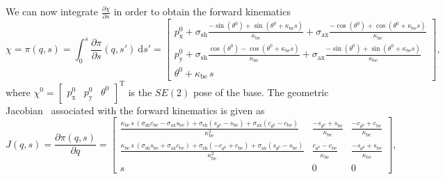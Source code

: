 We can now integrate $\frac{\partial \chi}{\partial s}$ in order to obtain the forward kinematics
\begin{equation}\label{eq:background:kinematics:planar_constant_strain:forward_kinematics}
    \chi = \pi(q,s) = \int_{0}^{s} \frac{\partial \pi}{\partial s}(q,s') \: \mathrm{d}s' = \begin{bmatrix}
        p_\mathrm{x}^0 + \sigma_\mathrm{sh} \frac{-\sin(\theta^0) + \sin(\theta^0 + \kappa_\mathrm{be} s)}{\kappa_\mathrm{be}} + \sigma_\mathrm{ax} \frac{-\cos(\theta^0) + \cos(\theta^0 + \kappa_\mathrm{be} s)}{\kappa_\mathrm{be}}\\
        p_\mathrm{y}^0 + \sigma_\mathrm{sh} \frac{\cos(\theta^0) - \cos(\theta^0 + \kappa_\mathrm{be} s)}{\kappa_\mathrm{be}} + \sigma_\mathrm{ax} \frac{-\sin(\theta^0)+\sin(\theta^0 + \kappa_\mathrm{be} s)}{\kappa_\mathrm{be}}\\
        \theta^0 + \kappa_\mathrm{be} \, s
    \end{bmatrix},
\end{equation}
where $\chi^0 = \begin{bmatrix}
    p_\mathrm{x}^0 & p_\mathrm{y}^0 & \theta^0
\end{bmatrix}^\mathrm{T}$ is the $SE(2)$ pose of the base.
The geometric Jacobian~\citep{siciliano2010robotics} associated with the forward kinematics is given as
\begin{equation}
    J(q,s) = \frac{\partial \pi(q,s)}{\partial q} = \begin{bmatrix}
        \frac{\kappa_\mathrm{be} \, s \, \left ( \sigma_\mathrm{sh} c_\mathrm{be} - \sigma_\mathrm{ax} s_\mathrm{be} \right ) + \sigma_\mathrm{sh} \left ( s_{\theta^0} - s_\mathrm{be} \right ) + \sigma_\mathrm{ax} \left ( c_{\theta^0} - c_\mathrm{be} \right )}{\kappa_\mathrm{be}^2}
        & \frac{-s_{\theta^0} + s_\mathrm{be}}{\kappa_\mathrm{be}}
        & \frac{-c_{\theta^0} + c_\mathrm{be}}{\kappa_\mathrm{be}}
        \\
        \frac{\kappa_\mathrm{be} \, s \, \left ( \sigma_\mathrm{sh} s_\mathrm{be} + \sigma_\mathrm{ax} c_\mathrm{be} \right ) + \sigma_\mathrm{sh} \left ( -c_{\theta^0} + c_\mathrm{be} \right ) + \sigma_\mathrm{ax} \left ( s_{\theta^0} - s_\mathrm{be} \right )}{\kappa_\mathrm{be}^2}
        & \frac{c_{\theta^0} - c_\mathrm{be}}{\kappa_\mathrm{be}}
        & \frac{-s_{\theta^0} + s_\mathrm{be}}{\kappa_\mathrm{be}}
        \\
        s & 0 & 0
    \end{bmatrix},
\end{equation}
